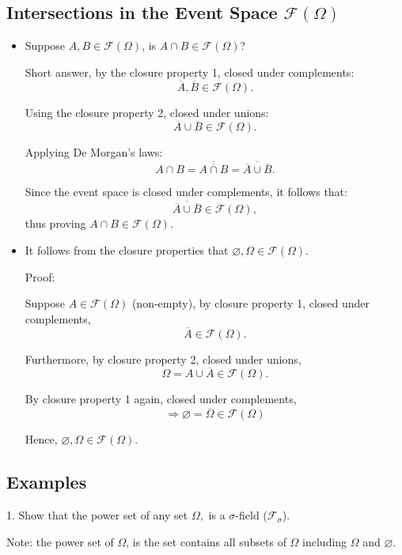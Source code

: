 \documentclass[12pt,thmsa]{article}
\let\emptyset\varnothing
\begin{document}
\subsection{Intersections in the Event Space \( \mathcal{F}(\Omega) \)} %
\begin{itemize}
	\item Suppose \( A, B \in \mathcal{F}(\Omega) \), is \( A \cap B \in \mathcal{F}(\Omega) \)?
	
	Short answer, by the closure property 1, closed under complements:
	\[ \overline{A}, \overline{B} \in \mathcal{F}(\Omega). \]
	
	Using the closure property 2, closed under unions:
	\[ \overline{A} \cup \overline{B} \in \mathcal{F}(\Omega). \]
	
	Applying De Morgan's laws:
	\[ A \cap B  = \overline{\overline{A \cap B}} = \overline{\overline{A} \cup \overline{B}}. \]
	
	Since the event space is closed under complements, it follows that:
	\[ \overline{\overline{A} \cup \overline{B}} \in \mathcal{F}(\Omega), \]
	thus proving \( A \cap B \in \mathcal{F}(\Omega) \).
	
	\item It follows from the closure properties that \( \emptyset, \Omega \in \mathcal{F}(\Omega) \).
	
	Proof:
	
	Suppose \( A \in \mathcal{F}(\Omega) \) (non-empty), by closure property 1, closed under complements,
	\[ \overline{A} \in \mathcal{F}(\Omega). \]
	
	Furthermore, by closure property 2, closed under unions,
	\[ \Omega = A \cup \overline{A} \in \mathcal{F}(\Omega). \]
	
	By closure property 1 again, closed under complements,
	\[ \Rightarrow \emptyset = \overline{\Omega} \in \mathcal{F}(\Omega) \] 
	
	Hence, \( \emptyset, \Omega \in \mathcal{F}(\Omega) \).
\end{itemize}


\subsection{Examples}
1. Show that the power set of any set \(\Omega,\) is a \(\sigma\)-field (\(\mathcal{F}_{\sigma}\)).

Note: the power set of \(\Omega\), is the set contains all subsets of \(\Omega\) including \(\Omega\) and \(\emptyset\).
\end{document}
